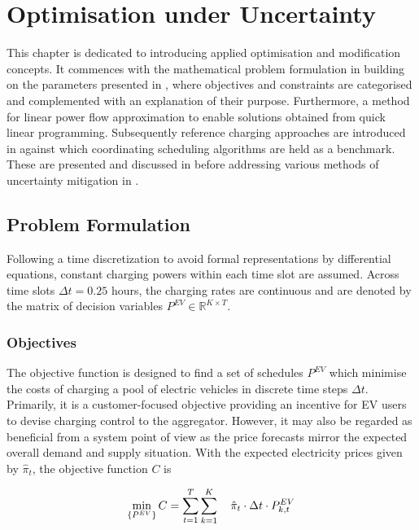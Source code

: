 \chapter{Optimisation under Uncertainty}
\label{sec:opt}

This chapter is dedicated to introducing applied optimisation and modification concepts. It commences with the mathematical problem formulation in  building on the parameters presented in , where objectives and constraints are categorised and complemented with an explanation of their purpose. Furthermore, a method for linear power flow approximation to enable solutions obtained from quick linear programming. Subsequently reference charging approaches are introduced in  against which coordinating scheduling algorithms are held as a benchmark. These are presented and discussed in  before addressing various methods of uncertainty mitigation in .

\section{Problem Formulation}
\label{sec:pf}

Following a time discretization to avoid formal representations by differential equations, constant charging powers within each time slot are assumed. Across time slots $\Delta t = 0.25$ hours, the charging rates are continuous and are denoted by the matrix of decision variables  $P^{EV}\in \mathbb{R}^{K\times T}$.

\subsection{Objectives}

The objective function is designed to find a set of schedules $P^{EV}$ which minimise the costs of charging a pool of electric vehicles in discrete time steps $\Delta t$. Primarily, it is a customer-focused objective providing an incentive for EV users to devise charging control to the aggregator. However, it may also be regarded as beneficial from a system point of view as the price forecasts mirror the expected overall demand and supply situation. With the expected electricity prices given by $\hat{\pi}_t$, the objective function $C$ is

\begin{equation}
	\label{eq:obj1}
	\min_{\{P^{EV}\}} C=\sum_{t=1}^T \sum_{k=1}^{K} \quad \hat{\pi}_t \cdot \Delta t \cdot P^{EV}_{k,t} 
\end{equation}

